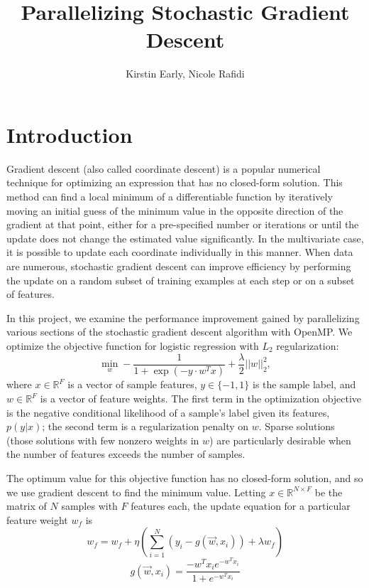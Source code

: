 \documentclass{article}
\title{Parallelizing Stochastic Gradient Descent}
\author{Kirstin Early, \qquad Nicole Rafidi}
\begin{document}
\maketitle

\section{Introduction}
Gradient descent (also called coordinate descent) is a popular numerical technique for optimizing an expression that has no closed-form solution. This method can find a local minimum of a differentiable function by iteratively moving an initial guess of the minimum value in the opposite direction of the gradient at that point, either for a pre-specified number or iterations or until the update does not change the estimated value significantly. In the multivariate case, it is possible to update each coordinate individually in this manner. When data are numerous, stochastic gradient descent can improve efficiency by performing the update on a random subset of training examples at each step or on a subset of features. %

In this project, we examine the performance improvement gained by parallelizing various sections of the stochastic gradient descent algorithm with OpenMP. We optimize the objective function for logistic regression with $L_2$ regularization:
\begin{equation}
\underset{w}{\min}-\frac{1}{1 + \exp(-y \cdot w^T x)} + \frac{\lambda}{2}||w||^2_2,
\end{equation}
where $x \in \mathbb{R}^F$ is a vector of sample features, $y \in \lbrace -1, 1 \rbrace$ is the sample label, and $w \in \mathbb{R}^F$ is a vector of feature weights. The first term in the optimization objective is the negative conditional likelihood of a sample's label given its features, $p(y|x)$; the second term is a regularization penalty on $w$. Sparse solutions (those solutions with few nonzero weights in $w$) are particularly desirable when the number of features exceeds the number of samples.

The optimum value for this objective function has no closed-form solution, and so we use gradient descent to find the minimum value. Letting $x \in \mathbb{R}^{N \times F}$ be the matrix of $N$ samples with $F$ features each, the update equation for a particular feature weight $w_f$ is
\begin{equation}
w_f = w_f + \eta \left( \sum_{i = 1}^{N}(y_i - g(\vec{w}, x_i)) + \lambda w_f \right)
\end{equation}
\begin{equation}
g(\vec{w}, x_i) = \frac{-w^Tx_ie^{-w^Tx_i}}{1 + e^{-w^Tx_i}}
\end{equation}
\end{document}
